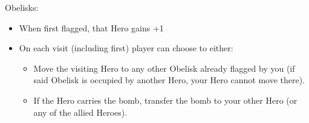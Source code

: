 \begin{multicols}{2}
Obelisks:
\begin{itemize}
  \item When first flagged, that Hero gains +1 
  \item On each visit (including first) player can choose to either:
  \begin{itemize}
    \item Move the visiting Hero to any other Obelisk already flagged by you (if said Obelisk is occupied by another Hero, your Hero cannot move there).
    \item If the Hero carries the bomb, transfer the bomb to your other Hero (or any of the allied Heroes).
  \end{itemize}
\end{itemize}

\end{multicols}


\newpage

